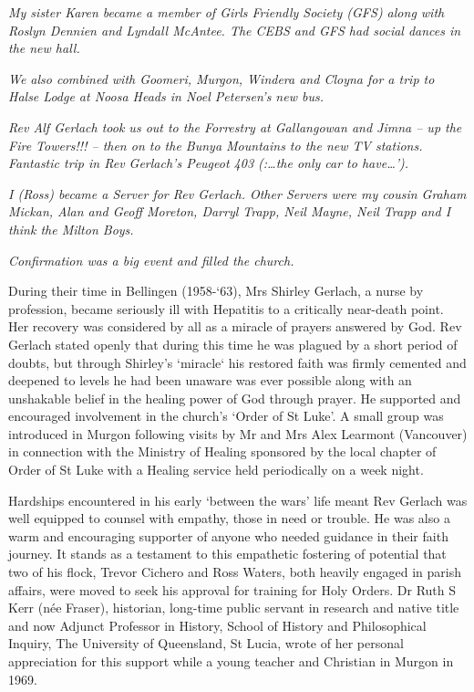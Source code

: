 \emph{My sister Karen became a member of Girls Friendly Society (GFS) along with Roslyn Dennien and Lyndall McAntee. The CEBS and GFS had social dances in the new hall.}

\emph{We also combined with Goomeri, Murgon, Windera and Cloyna for a trip to Halse Lodge at Noosa Heads in Noel Petersen's new bus.}

\emph{Rev Alf Gerlach took us out to the Forrestry at Gallangowan and Jimna -- up the Fire Towers!!! -- then on to the Bunya Mountains to the new TV stations. Fantastic trip in Rev Gerlach's Peugeot 403 (:\ldots the only car to have\ldots').}

\emph{I (Ross) became a Server for Rev Gerlach. Other Servers were my cousin Graham Mickan, Alan and Geoff Moreton, Darryl Trapp, Neil Mayne, Neil Trapp and I think the Milton Boys.}

\emph{Confirmation was a big event and filled the church.}

During their time in Bellingen (1958-`63), Mrs Shirley Gerlach, a nurse by profession, became seriously ill with Hepatitis to a critically near-death point. Her recovery was considered by all as a miracle of prayers answered by God. Rev Gerlach stated openly that during this time he was plagued by a short period of doubts, but through Shirley's `miracle` his restored faith was firmly cemented and deepened to levels he had been unaware was ever possible along with an unshakable belief in the healing power of God through prayer. He supported and encouraged involvement in the church's `Order of St Luke'. A small group was introduced in Murgon following visits by Mr and Mrs Alex Learmont (Vancouver) in connection with the Ministry of Healing sponsored by the local chapter of Order of St Luke with a Healing service held periodically on a week night.

Hardships encountered in his early `between the wars' life meant Rev Gerlach was well equipped to counsel with empathy, those in need or trouble. He was also a warm and encouraging supporter of anyone who needed guidance in their faith journey. It stands as a testament to this empathetic fostering of potential that two of his flock, Trevor Cichero and Ross Waters, both heavily engaged in parish affairs, were moved to seek his approval for training for Holy Orders. Dr Ruth S Kerr (née Fraser), historian, long-time public servant in research and native title and now Adjunct Professor in History, School of History and Philosophical Inquiry, The University of Queensland, St Lucia, wrote of her personal appreciation for this support while a young teacher and Christian in Murgon in 1969.

